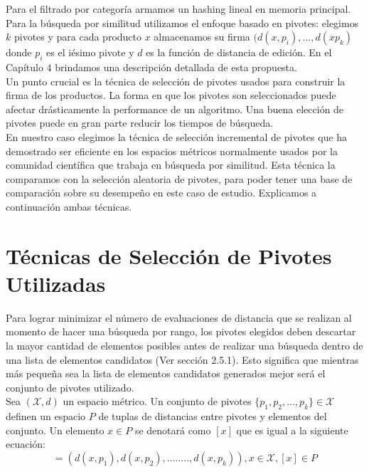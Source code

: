 Para el filtrado por categor\'ia armamos un hashing lineal en memoria principal. Para la búsqueda por similitud utilizamos el enfoque basado en pivotes: elegimos $k$ pivotes y para cada producto $x$ almacenamos su firma $(d(x,p_i), \ldots, d(xp_k)$ donde $p_i$ es el i\'esimo pivote y $d$ es la funci\'on de distancia de edici\'on. En el Cap\'itulo 4 brindamos una descripci\'on detallada de esta propuesta.\\
 
Un punto crucial es la t\'ecnica de selecci\'on de pivotes usados para construir la firma de los productos. La forma en que los pivotes son seleccionados puede afectar dr\'asticamente la performance de un algoritmo. Una buena elecci\'on de pivotes puede en gran parte reducir los tiempos de b\'usqueda.\\
 
En nuestro caso elegimos la t\'ecnica de selecci\'on incremental de pivotes \cite{BNCsccc01} que ha demostrado ser eficiente en los espacios m\'etricos  normalmente usados por la comunidad cient\'ifica que trabaja en b\'usqueda por similitud. Esta t\'ecnica la comparamos con la selecci\'on aleatoria de pivotes, para poder tener una base de comparaci\'on sobre su desempeño en este caso de estudio. Explicamos a continuaci\'on ambas t\'ecnicas.\\
 
\section{T\'ecnicas de Selecci\'on de Pivotes Utilizadas}

Para lograr minimizar el n\'umero de evaluaciones de distancia que se realizan al momento de hacer una b\'usqueda por rango, los pivotes elegidos deben descartar la mayor cantidad de elementos posibles antes de realizar una b\'usqueda dentro de una lista de elementos candidatos (Ver secci\'on 2.5.1). Esto significa que mientras más peque\~na sea la lista de elementos candidatos generados mejor ser\'a el conjunto de pivotes utilizado. \\

Sea $(\mathcal{X},d)$ un espacio m\'etrico. Un conjunto de pivotes $\{p_1,p_2,...,p_k\} \in \mathcal{X}$ definen un espacio $P$ de tuplas de distancias entre pivotes y elementos del conjunto. Un elemento $x \in P$ se denotar\'a como $[x]$ que es igual a la siguiente ecuaci\'on:\\

\begin{equation}
[x] = (d(x,p_1),d(x,p_2),........,d(x,p_k)), x \in \mathcal{X}, [x] \in P
\label{eq-mapeo}
\end{equation}
\\

